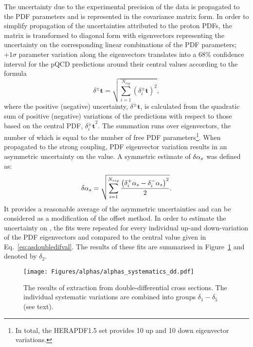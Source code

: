 The uncertainty due to the experimental precision of the data is propagated to the PDF parameters and is represented in the covariance matrix form. In order to simplify propagation of the uncertainties attributed to the proton PDFs, the matrix is transformed to diagonal form with eigenvectors representing the uncertainty on the corresponding linear combinations of the PDF parameters; $+1\sigma$ parameter variation along the eigenvectors translates into a 68\% confidence interval for the pQCD predictions around their central values according to the formula~\cite{Campbell:2006wx}
\begin{equation}
 \delta^{\pm}\mathbf{t} = \sqrt{\sum_{i=1}^{N_{eig}}{\left(\mbox{$\delta_i^{\pm}\mathbf{t}$}\right)^2}},
 \label{eq:mastereq}
\end{equation}
where the positive (negative) uncertainty, $\delta^{\pm}\mathbf{t}$, is calculated from the quadratic sum of positive (negative) variations of the predictions with respect to those based on the central PDF, $\mbox{$\delta_i^{\pm}\mathbf{t}$}^2$. The summation runs over eigenvectors, the number of which is equal to the number of free PDF parameters\footnote{In total, the HERAPDF1.5 set provides 10 up and 10 down eigenvector variations.}. When propagated to the strong coupling, PDF eigenvector variation results in an asymmetric uncertainty on the \as value. A symmetric estimate of $\delta\mbox{$\alpha_{s}$}$ was defined as:
\begin{equation}
 \delta\mbox{$\alpha_{s}$} = \sqrt{\sum_{i=1}^{N_{eig}}{\frac{\left(\mbox{$\delta_i^{+}\mbox{$\alpha_{s}$}$} - \mbox{$\delta_i^{-}\mbox{$\alpha_{s}$}$}\right)^2}{2}}}.
 \label{eq:mastereqsym}
\end{equation}
It provides a reasonable average of the asymmetric uncertainties and can be considered as a modification of the offset method. In order to estimate the uncertainty on \asz, the \as fits were repeated for every individual up-and down-variation of the PDF eigenvectors and compared to the central value given in Eq.~\ref{eq:asdoubledifval}. The results of these fits are summarised in Figure~\ref{fig:asthunc_dd} and denoted by $\delta_2$.
\begin{landscape}
\begin{figure}[p]
 \centering
 \caption{The results of \asz extraction from double-differential cross sections. The individual systematic variations are combined into groups $\delta_1-\delta_5$ (see text).}
 \label{fig:asthunc_dd}
 \texttt{[image: Figures/alphas/alphas\_systematics\_dd.pdf]}
\end{figure}
\end{landscape}


